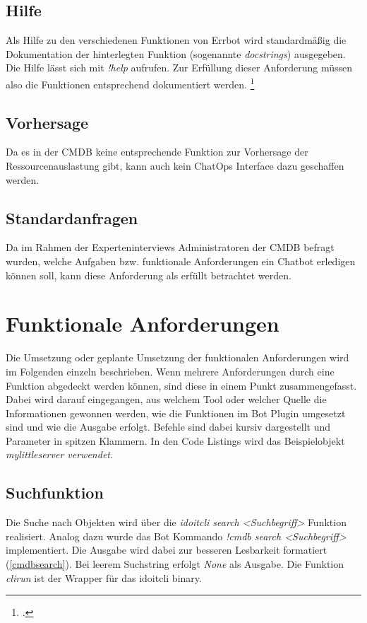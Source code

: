 \subsection{Hilfe}
Als Hilfe zu den verschiedenen Funktionen von Errbot wird standardmäßig die Dokumentation der hinterlegten Funktion (sogenannte \textit{docstrings}) ausgegeben. Die Hilfe lässt sich mit \textit{!help} aufrufen. Zur Erfüllung dieser Anforderung müssen also die Funktionen entsprechend dokumentiert werden.
\footcites[Vgl.][o. \pno]{errbot_2018_general}[Vgl.][o. \pno]{pep257}

\subsection{Vorhersage}
 Da es in der \acs{CMDB} keine entsprechende Funktion zur Vorhersage der Ressourcenauslastung gibt, kann auch kein ChatOps Interface dazu geschaffen werden.


\subsection{Standardanfragen}
Da im Rahmen der Experteninterviews Administratoren der \acs{CMDB} befragt wurden, welche Aufgaben bzw. funktionale Anforderungen ein Chatbot erledigen können soll, kann diese Anforderung als erfüllt betrachtet werden. 



\section{Funktionale Anforderungen}
Die Umsetzung oder geplante Umsetzung der funktionalen Anforderungen wird im Folgenden einzeln beschrieben. Wenn mehrere Anforderungen durch eine Funktion abgedeckt werden können, sind diese in einem Punkt zusammengefasst. Dabei wird darauf eingegangen, aus welchem Tool oder welcher Quelle die Informationen gewonnen werden, wie die Funktionen im Bot Plugin umgesetzt sind und wie die Ausgabe erfolgt. Befehle sind dabei kursiv dargestellt und Parameter in spitzen Klammern. In den Code Listings wird das Beispielobjekt \textit{mylittleserver verwendet}.

\subsection{Suchfunktion}
Die Suche nach Objekten wird über die \textit{idoitcli search <Suchbegriff>} Funktion realisiert. Analog dazu wurde das Bot Kommando \textit{!cmdb search <Suchbegriff>} implementiert. Die Ausgabe wird dabei zur besseren Lesbarkeit formatiert (\autoref{cmdbsearch}). Bei leerem Suchstring erfolgt \textit{None} als Ausgabe. Die Funktion \textit{clirun} ist der Wrapper für das idoitcli binary.

